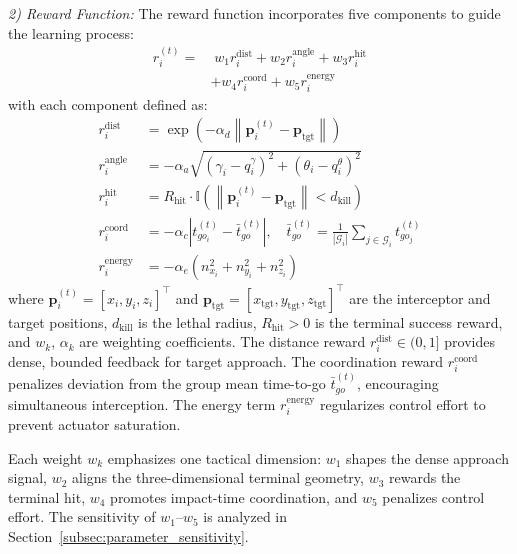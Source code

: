 \documentclass[lettersize,journal]{IEEEtran}
\begin{document}
\emph{2) Reward Function:} The reward function incorporates five components to guide the learning process:
\begin{equation}
\label{eq:reward_function}
\begin{split}
r_i^{(t)} =& \; w_1 r_i^{\text{dist}} + w_2 r_i^{\text{angle}} + w_3 r_i^{\text{hit}} \\
&+ w_4 r_i^{\text{coord}} + w_5 r_i^{\text{energy}}
\end{split}
\end{equation}
with each component defined as:
\begin{align}
r_i^{\text{dist}} &= \exp\!\left(-\alpha_d \left\|\mathbf{p}_i^{(t)} - \mathbf{p}_{\text{tgt}}\right\|\right) \label{eq:r_dist}\\
r_i^{\text{angle}} &= -\alpha_a\sqrt{\left(\gamma_i-q_i^{\gamma}\right)^2+\left(\theta_i-q_i^{\theta}\right)^2} \label{eq:r_angle}\\
r_i^{\text{hit}} &= R_{\text{hit}} \cdot \mathbb{I}\!\left(\left\|\mathbf{p}_i^{(t)} - \mathbf{p}_{\text{tgt}}\right\| < d_{\text{kill}}\right) \label{eq:r_hit}\\
r_i^{\text{coord}} &= -\alpha_c \left| t_{go_i}^{(t)} - \bar{t}_{go}^{(t)} \right|, \quad \bar{t}_{go}^{(t)} = \frac{1}{|\mathcal{G}_i|}\sum_{j \in \mathcal{G}_i} t_{go_j}^{(t)} \label{eq:r_coord}\\
r_i^{\text{energy}} &= -\alpha_e\left(n_{x_i}^2+n_{y_i}^2+n_{z_i}^2\right) \label{eq:r_energy}
\end{align}
where $\mathbf{p}_i^{(t)}=[x_i,y_i,z_i]^\top$ and $\mathbf{p}_{\mathrm{tgt}}=[x_{\mathrm{tgt}},y_{\mathrm{tgt}},z_{\mathrm{tgt}}]^\top$ are the interceptor and target positions, $d_{\text{kill}}$ is the lethal radius, $R_{\text{hit}} > 0$ is the terminal success reward, and $w_k$, $\alpha_k$ are weighting coefficients. The distance reward $r_i^{\text{dist}} \in (0,1]$ provides dense, bounded feedback for target approach. 
The coordination reward $r_i^{\text{coord}}$ penalizes deviation from the group mean time-to-go $\bar{t}_{go}^{(t)}$, encouraging simultaneous interception.
The energy term $r_i^{\text{energy}}$ regularizes control effort to prevent actuator saturation.

Each weight $w_k$ emphasizes one tactical dimension: $w_1$ shapes the dense approach signal, $w_2$ aligns the three-dimensional terminal geometry, $w_3$ rewards the terminal hit, $w_4$ promotes impact-time coordination, and $w_5$ penalizes control effort. The sensitivity of $w_1$--$w_5$ is analyzed in Section~\ref{subsec:parameter_sensitivity}.
\end{document}
